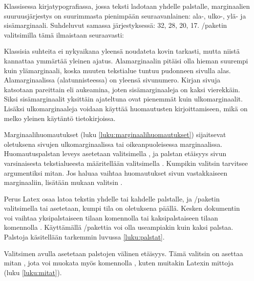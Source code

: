 Klassisessa kirja\-typo\-grafiassa, jossa teksti ladotaan yhdelle
palstalle, marginaalien suuruusjärjestys on suurimmasta pienimpään
seuraavanlainen: ala-, ulko-, ylä- ja sisämarginaali. Suhdeluvut samassa
järjestyksessä: 32, 28, 20, 17. \-/paketin
valitsimilla tämä ilmaistaan seuraavasti:

\begin{koodilohkosis}
  \geometry{hmarginratio=17:28, vmarginratio=20:32}
\end{koodilohkosis}

Klassisia suhteita ei nyky\-aikana yleensä noudateta kovin tarkasti,
mutta niistä kannattaa ymmärtää yleinen ajatus. Alamarginaalin pitäisi
olla hieman suurempi kuin ylämarginaali, koska muuten tekstialue tuntuu
pudonneen sivulla alas. Alamarginaalissa (alatunnisteessa) on yleensä
sivunumero. Kirjan sivuja katsotaan pareittain eli aukeamina, joten
sisämarginaaleja on kaksi vierekkäin. Siksi sisämarginaalit yksittäin
ajateltuna ovat pienemmät kuin ulkomarginaalit. Lisäksi ulkomarginaaleja
voidaan käyttää huomautusten kirjoittamiseen, mikä on melko yleinen
käytäntö tietokirjoissa.

Marginaalihuomautukset (luku \ref{luku:marginaalihuomautukset})
sijaitsevat oletuksena sivujen ulkomarginaalissa tai oikeanpuoleisessa
marginaalissa. Huomautuspalstan leveys asetetaan valitsimella
,  ja palstan
etäisyys sivun varsinaisesta tekstialueesta määritellään valitsimella
.  Kumpikin valitsin
tarvitsee argumentiksi mitan. Jos haluaa vaihtaa huomautukset sivun
vastakkaiseen marginaaliin, lisätään mukaan valitsin
.

Perus Latex osaa latoa tekstin yhdelle  tai
kahdelle  palstalle, ja
\-/paketin valitsimella  tai
 asetetaan, kumpi tila on oletuksena päällä. Kesken
dokumentin voi vaihtaa yksipalstaiseen tilaan komennolla  tai kaksipalstaiseen tilaan komennolla . Käyttämällä
\-/pakettia voi olla useampiakin kuin
kaksi palstaa. Palstoja käsitellään tarkemmin luvussa
\ref{luku:palstat}.

Valitsimen   avulla
asetetaan palstojen välinen etäisyys. Tämä valitsin on asettaa mitan
, jota voi muokata myös komennolla , kuten muitakin Latexin mittoja (luku \ref{luku:mitat}).


